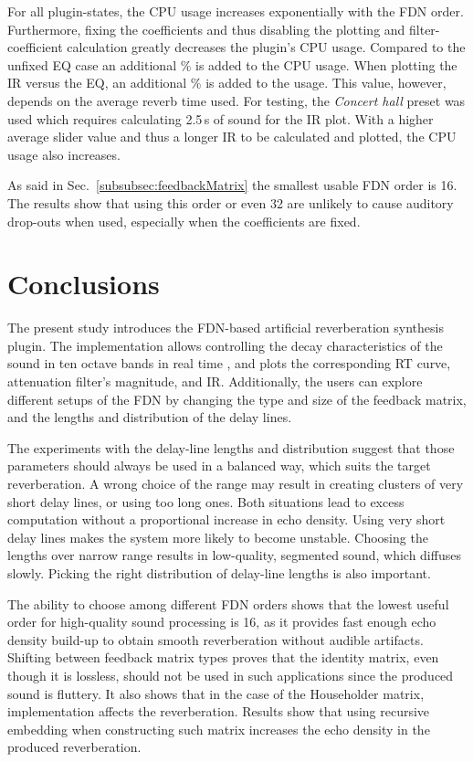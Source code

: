 \documentclass[twoside,a4paper]{article}
\newcommand{\silvin}[1]{\textcolor{ForestGreen}{#1}}
\newcommand{\karolina}[1]{\textcolor{blue}{#1}}
\begin{document}
For all plugin-states, the CPU usage increases exponentially with the FDN order. Furthermore, fixing the coefficients and thus disabling the plotting and filter-coefficient calculation greatly decreases the plugin's CPU usage. Compared to the unfixed EQ case an additional \% is added to the CPU usage. When plotting the IR versus the EQ, an additional \% is added to the usage. This value, however, depends on the average reverb time used. For testing, the \textit{Concert hall} preset was used which requires calculating 2.5\,s of sound for the IR plot. With a higher average slider value and thus a longer IR to be calculated and plotted, the CPU usage also increases.

As said in Sec.~\ref{subsubsec:feedbackMatrix} the smallest usable FDN order is 16. The results show that using this order or even 32 are unlikely to cause auditory drop-outs when used, especially when the coefficients are fixed.

\section{Conclusions}\label{sec:conclusion}

The present study introduces the FDN-based artificial reverberation synthesis plugin. The implementation allows controlling the decay characteristics of the sound in ten octave bands in real time%
, and plots the corresponding RT curve, attenuation filter's magnitude, and IR. %
Additionally, the users can explore different setups of the FDN by changing the type and size of the feedback matrix, and the lengths and distribution of the delay lines. 

The experiments with the delay-line lengths and distribution suggest that those parameters should always be used in a balanced way, which suits the target reverberation. A wrong choice of the range may result in creating clusters of very short delay lines, or using too long ones. Both situations lead to excess computation without a proportional increase in echo density. Using very short delay lines makes the system more likely to become unstable. Choosing the lengths over narrow range results in low-quality, segmented sound, which diffuses slowly. Picking the right distribution of delay-line lengths is also important.

The ability to choose among different FDN orders shows that the lowest useful order for high-quality sound processing is 16, as it provides fast enough echo density build-up to obtain smooth reverberation without audible artifacts. Shifting between feedback matrix types proves that the identity matrix, even though it is lossless, should not be used in such applications since the produced sound is fluttery. It also shows that in the case of the Householder matrix, implementation affects the reverberation. Results show that using recursive embedding when constructing such matrix increases the echo density in the produced reverberation.   %
\end{document}
